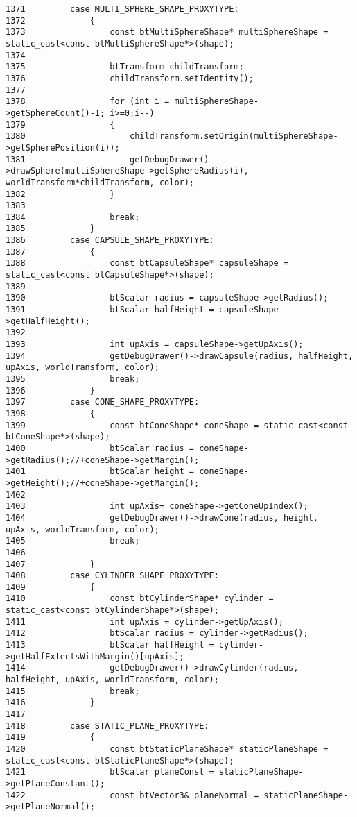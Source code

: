 \begin{Code}
\begin{verbatim}
1371         case MULTI_SPHERE_SHAPE_PROXYTYPE:
1372             {
1373                 const btMultiSphereShape* multiSphereShape = static_cast<const btMultiSphereShape*>(shape);
1374 
1375                 btTransform childTransform;
1376                 childTransform.setIdentity();
1377 
1378                 for (int i = multiSphereShape->getSphereCount()-1; i>=0;i--)
1379                 {
1380                     childTransform.setOrigin(multiSphereShape->getSpherePosition(i));
1381                     getDebugDrawer()->drawSphere(multiSphereShape->getSphereRadius(i), worldTransform*childTransform, color);
1382                 }
1383 
1384                 break;
1385             }
1386         case CAPSULE_SHAPE_PROXYTYPE:
1387             {
1388                 const btCapsuleShape* capsuleShape = static_cast<const btCapsuleShape*>(shape);
1389 
1390                 btScalar radius = capsuleShape->getRadius();
1391                 btScalar halfHeight = capsuleShape->getHalfHeight();
1392 
1393                 int upAxis = capsuleShape->getUpAxis();
1394                 getDebugDrawer()->drawCapsule(radius, halfHeight, upAxis, worldTransform, color);
1395                 break;
1396             }
1397         case CONE_SHAPE_PROXYTYPE:
1398             {
1399                 const btConeShape* coneShape = static_cast<const btConeShape*>(shape);
1400                 btScalar radius = coneShape->getRadius();//+coneShape->getMargin();
1401                 btScalar height = coneShape->getHeight();//+coneShape->getMargin();
1402 
1403                 int upAxis= coneShape->getConeUpIndex();
1404                 getDebugDrawer()->drawCone(radius, height, upAxis, worldTransform, color);
1405                 break;
1406 
1407             }
1408         case CYLINDER_SHAPE_PROXYTYPE:
1409             {
1410                 const btCylinderShape* cylinder = static_cast<const btCylinderShape*>(shape);
1411                 int upAxis = cylinder->getUpAxis();
1412                 btScalar radius = cylinder->getRadius();
1413                 btScalar halfHeight = cylinder->getHalfExtentsWithMargin()[upAxis];
1414                 getDebugDrawer()->drawCylinder(radius, halfHeight, upAxis, worldTransform, color);
1415                 break;
1416             }
1417 
1418         case STATIC_PLANE_PROXYTYPE:
1419             {
1420                 const btStaticPlaneShape* staticPlaneShape = static_cast<const btStaticPlaneShape*>(shape);
1421                 btScalar planeConst = staticPlaneShape->getPlaneConstant();
1422                 const btVector3& planeNormal = staticPlaneShape->getPlaneNormal();

\end{verbatim}
\end{Code}
